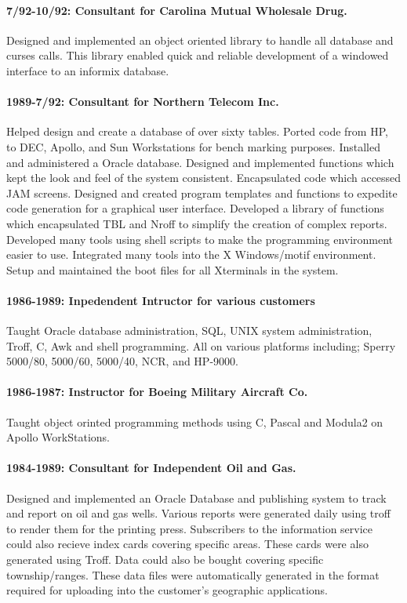 \documentclass{article}
\begin{document}
\paragraph{7/92-10/92: Consultant for Carolina Mutual Wholesale Drug.}
Designed and implemented an object oriented library to handle all database and curses calls.
This library enabled quick and reliable development of a windowed interface to an informix
database.


\paragraph{1989-7/92: Consultant for Northern Telecom Inc.}
Helped design and create a database of over sixty tables.  Ported code
from HP, to DEC, Apollo, and Sun Workstations for bench marking purposes.
Installed and administered a Oracle database.  Designed and implemented functions which kept the
look and feel of the system consistent.  Encapsulated code which accessed JAM screens.  Designed
and created program templates and functions to expedite code
generation for a graphical user interface.  Developed a library of functions which encapsulated TBL and Nroff to simplify the creation of complex reports.  Developed many tools using shell scripts to make the programming environment easier to use.  Integrated many tools into the X Windows/motif environment.  Setup and maintained the boot files for all Xterminals in the system.

\paragraph{1986-1989: Inpedendent Intructor for various customers}
Taught Oracle database administration, SQL, UNIX system administration, Troff, C, Awk and shell
programming.  All on various platforms including; Sperry 5000/80, 5000/60, 5000/40, NCR, and HP-9000.

\paragraph{1986-1987: Instructor for Boeing Military Aircraft Co.}
Taught object orinted programming methods using C, Pascal and Modula2 on Apollo WorkStations.

\paragraph{1984-1989: Consultant for Independent Oil and Gas.}
Designed and implemented an Oracle Database and publishing system
to track and report on oil and gas wells.  Various reports were
generated daily using troff to render them for the printing press.  Subscribers
to the information service could also recieve index cards covering
specific areas.  These cards were also generated using Troff. Data
could also be bought covering specific township/ranges.  These data
files were automatically generated in the format required for
uploading into the customer's geographic applications.
\end{document}
